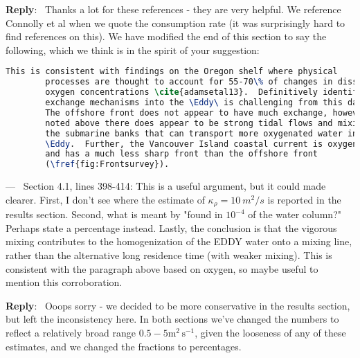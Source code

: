 \documentclass[11pt]{article}
\newcounter{reviewer}
\newcounter{point}[reviewer]
\renewcommand{\thepoint}{P\,\thereviewer.\arabic{point}}
\newenvironment{point}
   {\refstepcounter{point} \bigskip \noindent {\textbf{Reviewer~Point~\thepoint} } ---\ }
   {\par }
\newenvironment{reply}
   {\medskip \noindent \begin{sf}\textbf{Reply}:\  }
   {\medskip \end{sf}}
\begin{document}
\begin{reply}
    Thanks a lot for these references - they are very helpful.  We reference Connolly et al when we quote the consumption rate (it was surprisingly hard to find references on this).  We have modified the end of this section to say the following, which we think is in the spirit of your suggestion:

    \begin{lstlisting}[language=TeX, basicstyle=\small]
        This is consistent with findings on the Oregon shelf where physical
        processes are thought to account for 55-70\% of changes in dissolved
        oxygen concentrations \cite{adamsetal13}.  Definitively identifying the
        exchange mechanisms into the \Eddy\ is challenging from this data set.
        The offshore front does not appear to have much exchange, however as
        noted above there does appear to be strong tidal flows and mixing over
        the submarine banks that can transport more oxygenated water into the
        \Eddy.  Further, the Vancouver Island coastal current is oxygen rich,
        and has a much less sharp front than the offshore front
        (\fref{fig:Frontsurvey}).
    \end{lstlisting}

\end{reply}

\begin{point}
    Section 4.1, lines 398-414: This is a useful argument,
    but it could made clearer. First, I don't see where the estimate of $\kappa_\rho = 10\ m^2/s$ is reported in the
    results section. Second, what is meant by "found in $10^{-4}$ of the water column?" Perhaps state a percentage instead. Lastly, the conclusion is that the vigorous mixing contributes to the homogenization of the EDDY water onto a mixing line, rather than the alternative long residence time (with weaker mixing). This is consistent with the paragraph above based on oxygen, so maybe useful to mention this corroboration.
\end{point}

\begin{reply}
    Ooops sorry - we decided to be more conservative in the results section, but left the inconsistency here.  In both sections we've changed the numbers to reflect a relatively broad range $0.5-5 \mathrm{m^2\,s^{-1}}$, given the looseness of any of these estimates, and we changed the fractions to percentages.
\end{reply}
\end{document}
